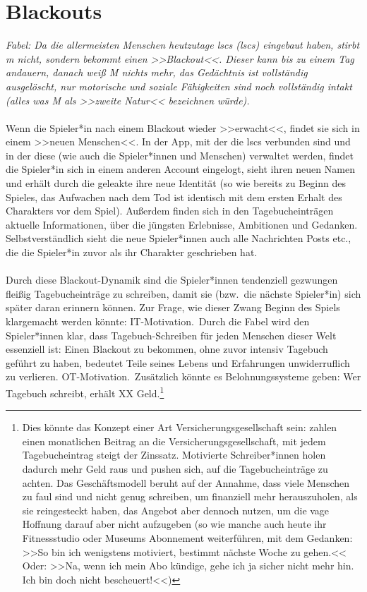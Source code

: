 \section{Blackouts}\label{sec:blackouts}

\emph{Fabel: Da die allermeisten Menschen heutzutage \aclp{lsc} (\ac{lsc}s)
eingebaut haben, stirbt \ac{m} nicht, sondern bekommt einen >>Blackout<<.
Dieser kann bis zu einem Tag andauern, danach weiß M nichts mehr, das
Gedächtnis ist vollständig ausgelöscht, nur motorische und soziale Fähigkeiten
sind noch vollständig intakt (alles was M als >>zweite Natur<< bezeichnen
würde).}\\\\
%
Wenn die Spieler*in nach einem Blackout wieder >>erwacht<<, findet sie sich in einem 
>>neuen Menschen<<. 
In der App, mit der die \ac{lsc}s verbunden sind und in der diese (wie auch die 
Spieler*innen und Menschen) verwaltet werden, findet die Spieler*in sich in
einem anderen Account eingelogt, sieht ihren neuen Namen und erhält durch die
geleakte  ihre neue Identität (so wie bereits zu Beginn des
Spieles, das Aufwachen nach dem Tod ist identisch mit dem ersten Erhalt des
Charakters vor dem Spiel). 
Außerdem finden sich in den Tagebucheinträgen aktuelle Informationen, über die
jüngsten Erlebnisse, Ambitionen und Gedanken. 
Selbstverständlich sieht die neue Spieler*innen auch alle Nachrichten Posts
etc., die die Spieler*in zuvor als ihr Charakter geschrieben hat.\\\\
%
Durch diese Blackout-Dynamik sind die Spieler*innen tendenziell gezwungen
fleißig Tagebucheinträge zu schreiben, damit sie (bzw.~die nächste Spieler*in) sich 
später daran erinnern können. 
Zur Frage, wie dieser Zwang Beginn des Spiels klargemacht werden könnte:
IT-Motivation.~Durch die Fabel wird den Spieler*innen klar, dass
Tagebuch-Schreiben für jeden Menschen dieser Welt essenziell ist: Einen Blackout
zu bekommen, ohne zuvor intensiv Tagebuch geführt zu haben, bedeutet Teile
seines Lebens und Erfahrungen unwiderruflich zu verlieren.
OT-Motivation.~Zusätzlich könnte es Belohnungssysteme geben: Wer Tagebuch
schreibt, erhält XX Geld.\footnote{
  Dies könnte das Konzept einer Art Versicherungsgesellschaft sein:
   zahlen einen monatlichen Beitrag an die
  Versicherungsgesellschaft, mit jedem Tagebucheintrag steigt der Zinssatz.
  Motivierte Schreiber*innen holen dadurch mehr Geld raus und pushen sich, auf
  die Tagebucheinträge zu achten. 
  Das Geschäftsmodell beruht auf der Annahme, dass viele Menschen zu
  faul sind und nicht genug schreiben, um finanziell mehr herauszuholen, als sie
  reingesteckt haben, das Angebot aber dennoch nutzen, um die vage Hoffnung
  darauf aber nicht aufzugeben (so wie manche auch heute ihr Fitnessstudio oder
  Museums Abonnement weiterführen, mit dem Gedanken: >>So bin ich wenigstens
  motiviert, bestimmt nächste Woche zu gehen.<< Oder: >>Na, wenn ich mein Abo
  kündige, gehe ich ja sicher nicht mehr hin. Ich bin doch nicht bescheuert!<<)
}
